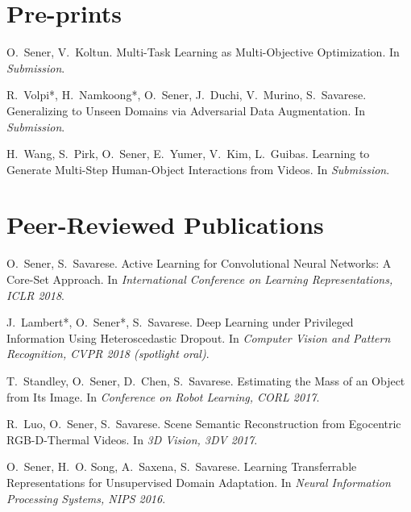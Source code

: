 
\section{\mysidestyle \textcolor{olgray}{Pre-prints}}


O.~Sener, V.~Koltun.
\newblock Multi-Task Learning as Multi-Objective Optimization. 
\newblock In {\em Submission}.
\vspace{-2mm}

R.~Volpi*, H.~Namkoong*, O.~Sener, J.~Duchi, V.~Murino, S.~Savarese.
\newblock Generalizing to Unseen Domains via Adversarial Data Augmentation. 
\newblock In {\em Submission}.
\vspace{-2mm}

H.~Wang, S.~Pirk, O.~Sener, E.~Yumer, V.~Kim, L.~Guibas.
\newblock Learning to Generate Multi-Step Human-Object Interactions from Videos. 
\newblock In {\em Submission}.
\vspace{-2mm}

\section{\mysidestyle \textcolor{olgray}{Peer-Reviewed Publications}}

O.~Sener, S.~Savarese.
\newblock Active Learning for Convolutional Neural Networks: A Core-Set Approach.
\newblock In {\em International Conference on Learning Representations, ICLR 2018}.
\vspace{-2mm}

J.~Lambert*, O.~Sener*, S.~Savarese.
\newblock Deep Learning under Privileged Information Using Heteroscedastic Dropout. 
\newblock In {\em Computer Vision and Pattern Recognition, CVPR 2018 (spotlight oral)}.
\vspace{-2mm}

T.~Standley, O.~Sener, D.~Chen, S.~Savarese.
\newblock Estimating the Mass of an Object from Its Image. 
\newblock In {\em Conference on Robot Learning, CORL 2017}.
\vspace{-2mm}

R.~Luo, O.~Sener, S.~Savarese.
\newblock Scene Semantic Reconstruction from Egocentric RGB-D-Thermal Videos. 
\newblock In {\em 3D Vision, 3DV 2017}.
\vspace{-2mm}

O.~Sener, H.~O. Song, A.~Saxena, S.~Savarese.
\newblock Learning Transferrable Representations for Unsupervised Domain Adaptation. 
\newblock In {\em Neural Information Processing Systems, NIPS 2016}.
\vspace{-2mm}

